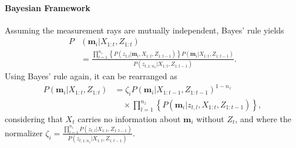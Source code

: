 \documentclass[letterpaper, 10pt, conference]{ieeeconf}
\newcommand{\braces}[1]{\ensuremath{\left\{ #1 \right\}}}
\newcommand{\refeqn}[1]{(\ref{eqn:#1})}
\begin{document}
\paragraph{Bayesian Framework} Assuming the measurement rays are mutually independent, Bayes' rule yields
\begin{align}
\label{eqn:ManyMeasBayesRule}
P&(\mathbf{m}_i|X_{1:t},Z_{1:t})\nonumber\\
&
=
\frac{\prod_{l=1}^{n_z}\braces{P(z_{t,l}|\mathbf{m}_i,X_{1:t},Z_{1:t-1})}P(\mathbf{m}_i|X_{1:t},Z_{1:t-1})}{P(z_{t,1:n_z}|X_{1:t},Z_{1:t-1})}.
\end{align}
Using Bayes' rule again, it can be rearranged as
\begin{align}
P(\mathbf{m}_i|X_{1:t},Z_{1:t})&=
\zeta_i P(\mathbf{m}_i|X_{1:t-1},Z_{1:t-1})^{1-n_z}\nonumber\\&\quad\times
\prod_{l=1}^{n_z}\left\{P(\mathbf{m}_i|z_{t,l},X_{1:t},Z_{1:t-1})\right\},
\label{eqn:ThirdBayesRule}
\end{align}
considering that $X_t$ carries no information about $\mathbf{m}_i$ without $Z_t$, and where the normalizer $\zeta_i = \frac{\prod_{l=1}^{n_z} P(z_{t,l}|X_{1:t},Z_{1:t-1})}{P(z_{t,1:n_z}|X_{1:t},Z_{1:t-1})}$.

\end{document}
